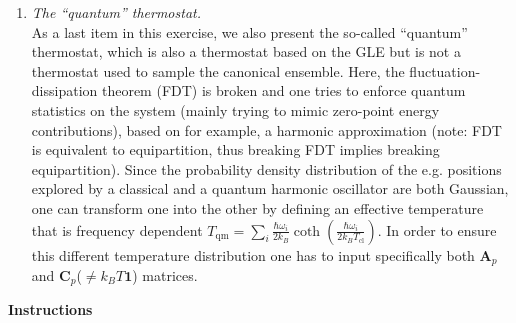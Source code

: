 \documentclass[a4paper,11pt]{scrartcl}
\begin{document}
\begin{enumerate}
\item \textit{The ``quantum'' thermostat.} \cite{ceriotti10}\\
 As a last item in this exercise, we also present the so-called ``quantum'' thermostat, which is also a thermostat based on the GLE but is not a thermostat used to sample the canonical ensemble.
 Here, the fluctuation-dissipation theorem (FDT) is broken and one tries to enforce quantum statistics on the system (mainly trying to mimic zero-point energy contributions), based on for example, a harmonic approximation (note: FDT is equivalent to equipartition, thus breaking FDT implies breaking equipartition). Since the probability density distribution of the e.g. positions explored by a classical and a quantum harmonic oscillator are both
 Gaussian, one can transform one into the other by defining an effective temperature that is frequency dependent $T_{\text{qm}}  = \sum_i \frac{\hbar \omega_i}{2 k_B} \coth \left(\frac{\hbar \omega_i }{2 k_B T_{\text{cl}}} \right)$.
 In order to ensure this different temperature distribution one has to input specifically both ${\textbf{A}}_p$ and ${\textbf{C}}_p$($\neq k_BT\textbf{1}$) matrices. 


\end{enumerate}

\noindent \textbf{Instructions}
\end{document}
